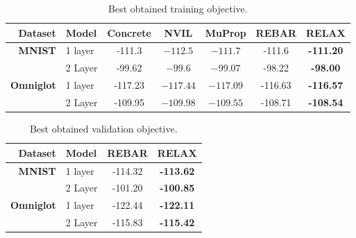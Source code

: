 \documentclass{article}
\newcommand{\E}{\mathbb{E}}
\newcommand{\PT}{\frac{\partial}{\partial \theta}}
\newcommand{\PP}[1]{\frac{\partial}{\partial #1}}
\begin{document}
\begin{table}[h]
\centering
\begin{tabular}{r l | c c c c c} 
Dataset & Model & Concrete & NVIL & MuProp  & REBAR & RELAX\\\midrule
\textbf{MNIST} & 1 layer  &-111.3 & $-112.5$ & $-111.7$  & -111.6 & \textbf{-111.20} \\ 
               & 2 Layer  &-99.62 & $-99.6$ & $-99.07$   & -98.22 & \textbf{-98.00} \\
\midrule
\textbf{Omniglot} & 1 layer &-117.23 & $-117.44$ & $-117.09$   & -116.63 & \textbf{-116.57} \\ 
                  & 2 Layer &-109.95 & $-109.98$ & $-109.55$  & -108.71 & \textbf{-108.54}
\end{tabular}
\caption{Best obtained training objective.}
\label{tab:vae tr}
\end{table}


\begin{table}[h]
\centering
\begin{tabular}{r l | c c} 
  Dataset & Model & REBAR & RELAX \\\midrule
\textbf{MNIST} & 1 layer  & -114.32 & \textbf{-113.62} \\ 
& 2 Layer  & -101.20 & \textbf{-100.85} \\ \midrule
\textbf{Omniglot} & 1 layer & -122.44 & \textbf{-122.11} \\ 
& 2 Layer & -115.83 & \textbf{-115.42}
\end{tabular}
\caption{Best obtained validation objective.}
\label{tab:vae val}
\end{table}

\end{document}
